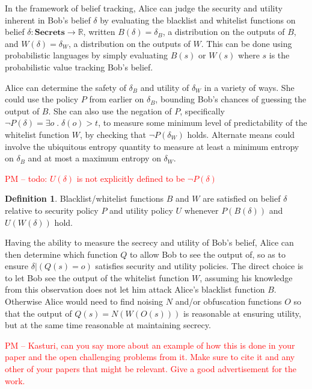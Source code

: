 \documentclass{article} %
\newcommand{\pxm}[1]{\textcolor{red}{PM -- #1}}
\newcommand{\ra}{\rightarrow}
\newcommand{\Real}{\mathbb{R}}
\newcommand{\secrets}[0]{\textbf{Secrets}}
\newcommand{\paren}[1]{\left( #1 \right)}
\newcommand{\cond}[0]{|}
\newcommand{\qsep}[0]{\; . \;}
\theoremstyle{plain} %
\theoremstyle{definition} %
\newtheorem*{definition-un}{Definition}
\begin{document}
In the framework of belief tracking, Alice can judge the security and
utility inherent in Bob's belief $ \delta $ by evaluating the
blacklist and whitelist functions on belief $ \delta : \secrets \ra
\Real $, written $ B(\delta) = \delta_B $, a distribution on the
outputs of $ B $, and $ W(\delta) = \delta_W$, a distribution on the
outputs of $ W $. This can be done using probabilistic languages by
simply evaluating $ B(s) $ or $ W(s) $ where $ s $ is the probabilistic
value tracking Bob's belief.

Alice can determine the safety of $ \delta_B $ and utility of $
\delta_W $ in a variety of ways. She could use the policy $ P $ from
earlier on $ \delta_B $, bounding Bob's chances of guessing the output
of $ B $. She can also use the negation of $ P $, specifically $ \neg
P(\delta) = \exists o \qsep \delta(o) > t $, to measure some minimum
level of predictability of the whitelist function $ W $, by checking
that $ \neg P(\delta_W) $ holds. Alternate means could involve the
ubiquitous entropy quantity to measure at least a minimum entropy on $
\delta_B $ and at most a maximum entropy on $ \delta_W $.

\pxm{todo: $ U(\delta) $ is not explicitly defined to be $ \neg P(\delta) $}
\begin{definition-un} Blacklist/whitelist functions $ B $ and $ W $
  are satisfied on belief $ \delta $ relative to security policy $ P $
  and utility policy $  U $ whenever $P(B(\delta))$ and $U(W(\delta))$ hold.
\end{definition-un}

Having the ability to measure the secrecy and utility of Bob's belief,
Alice can then determine which function $ Q $ to allow Bob to see the
output of, so as to ensure $ \delta \cond \paren{Q(s) = o} $ satisfies
security and utility policies. The direct choice is to let Bob see the
output of the whitelist function $ W $, assuming his knowledge from
this observation does not let him attack Alice's blacklist function $
B $. Otherwise Alice would need to find noising $ N $ and/or
obfuscation functions $ O $ so that the output of $ Q(s) = N(W(O(s)))
$ is reasonable at ensuring utility, but at the same time reasonable
at maintaining secrecy.

\pxm{Kasturi, can you say more about an example of how this is done in
  your paper and the open challenging problems from it. Make sure to
  cite it \cite{chakraborty12balancing} and any other of your papers
  that might be relevant. Give a good advertisement for the work.}
\end{document}
